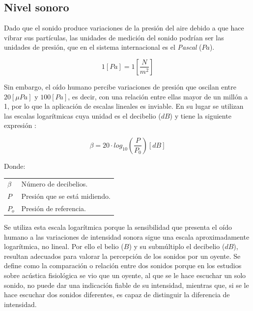 \documentclass[letter,11pt]{article}
\makeatletter
\newenvironment{conditions}
  {\par\vspace{\abovedisplayskip}\noindent\begin{tabular}{>{$}l<{$} @{${}={}$} l}}
  {\end{tabular}\par\vspace{\belowdisplayskip}}
\makeatother
\begin{document}
\subsection{Nivel sonoro}

Dado que el sonido produce variaciones de la presión del aire debido a que hace
vibrar sus partículas, las unidades de medición del sonido podrían ser las
unidades de presión, que en el sistema internacional es el \emph{Pascal} ($Pa$).

\begin{equation*}
    1 [Pa] = 1 \left[\frac{N}{m^2}\right]
\end{equation*}
\vspace{0.10cm}

Sin embargo, el oído humano percibe variaciones de presión que oscilan entre 
$20 [\mu Pa]$ y $100 [Pa]$, es decir, con una relación entre ellas mayor de un
millón a 1, por lo que la aplicación de escalas lineales es inviable. En su
lugar se utilizan las escalas logarítmicas cuya unidad es el decibelio ($dB$) y
tiene la siguiente expresión \cite{SUPERINTENDENCIA}:

\begin{equation*}
    \beta = 20\cdot log_{10}\left(\frac{P}{P_0}\right) [dB]
\end{equation*}
\vspace{0.10cm}

Donde:

\begin{conditions}
\beta & Número de decibelios. \\
P     & Presión que se está midiendo. \\
P_o   & Presión de referencia. \\
\end{conditions}

Se utiliza esta escala logarítmica porque la sensibilidad que presenta el oído
humano a las variaciones de intensidad sonora sigue una escala aproximadamente
logarítmica, no lineal. Por ello el belio ($B$) y su submúltiplo el decibelio
($dB$), resultan adecuados para valorar la percepción de los sonidos por un
oyente. Se define como la comparación o relación entre dos sonidos porque en los
estudios sobre acústica fisiológica se vio que un oyente, al que se le hace
escuchar un solo sonido, no puede dar una indicación fiable de su intensidad,
mientras que, si se le hace escuchar dos sonidos diferentes, es capaz de
distinguir la diferencia de intensidad.
\\
\end{document}
